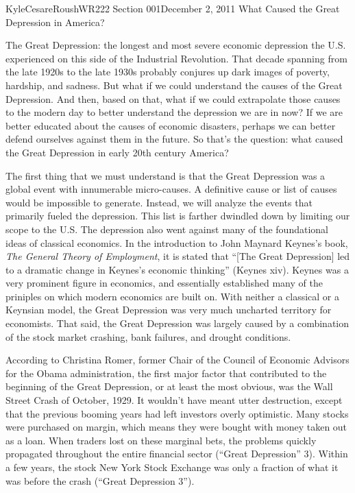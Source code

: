 \documentclass[12pt,letterpaper]{article}
\begin{document}
\begin{mla}{Kyle}{Cesare}{Roush}{WR222 Section 001}{December 2, 2011}{
What Caused the Great Depression in America?}

The Great Depression: the longest and most severe economic depression the U.S.
experienced on this side of the Industrial Revolution.  That decade spanning
from the late 1920s to the late 1930s probably conjures up dark images of
poverty, hardship, and sadness.  But what if we could understand the causes of
the Great Depression.  And then, based on that, what if we could extrapolate
those causes to the modern day to better understand the depression we are in
now?  If we are better educated about the causes of economic disasters, perhaps
we can better defend ourselves against them in the future.  So that's the
question: what caused the Great Depression in early 20th century America?

The first thing that we must understand is that the Great Depression was a
global event with innumerable micro-causes.  A definitive cause or list of
causes would be impossible to generate.  Instead, we will analyze the events
that primarily fueled the depression.  This list is farther dwindled down by
limiting our scope to the U.S.  The depression also went against many of the
foundational ideas of classical economics.  In the introduction to John Maynard
Keynes's book, \emph{The General Theory of Employment}, it is stated that ``[The
Great Depression] led to a dramatic change in Keynes's economic thinking''
(Keynes xiv).  Keynes was a very prominent figure in economics, and essentially
established many of the priniples on which modern economics are built on.  With
neither a classical or a Keynsian model, the Great Depression was very much
uncharted territory for economists.  That said, the Great Depression was largely
caused by a combination of the stock market crashing, bank failures, and drought
conditions.

According to Christina Romer, former Chair of the Council of Economic Advisors
for the Obama administration, the first major factor that contributed to the
beginning of the Great Depression, or at least the most obvious, was the Wall
Street Crash of October, 1929.  It wouldn't have meant utter destruction, except
that the previous booming years had left investors overly optimistic.  Many
stocks were purchased on margin, which means they were bought with money taken
out as a loan.  When traders lost on these marginal bets, the problems quickly
propagated throughout the entire financial sector (``Great Depression'' 3).
Within a few years, the stock New York Stock Exchange was only a fraction of
what it was before the crash (``Great Depression 3'').


\end{mla}
\end{document}
